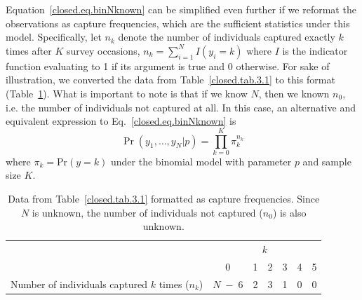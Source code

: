 Equation~\ref{closed.eq.binNknown} can be simplified even further if we reformat the
observations as capture frequencies, which are the sufficient
statistics under this model. Specifically, let $n_k$ denote the number
of individuals captured exactly $k$ times after $K$ survey occasions, $n_k = \sum_{i=1}^N
I(y_i = k)$ where $I$ is the indicator function evaluating to 1 if its
argument is true and 0 otherwise. For sake of illustration,
we converted the data from Table~\ref{closed.tab.3.1} to this
format (Table~\ref{closed.tab.3.1.nk}). What is important to note is
that if we know $N$, then we known $n_0$, i.e. the number of
individuals not captured at all. In this case, an alternative and equivalent expression to
Eq.~\ref{closed.eq.binNknown} is
\begin{equation}
  \Pr(y_1, \ldots, y_N | p) = \prod_{k=0}^K  \pi_{k}^{n_k}
  \label{closed.eq.multiNknown}
\end{equation}
where $\pi_{k} = \mathrm{Pr}(y=k)$ under the binomial model with
parameter $p$ and sample size $K$. 

\begin{table}[ht]
\centering
\caption{Data from Table~\ref{closed.tab.3.1} formatted as capture
  frequencies. Since $N$ is unknown, the number of individuals not
  captured ($n_0$) is also unknown.}
\begin{tabular}{lcccccc}
\hline
& \multicolumn{6}{c}{$k$} \\
\cline{2-7}
 & 0  & 1 & 2 & 3 & 4 & 5 \\
\hline
Number of individuals captured $k$ times ($n_k$) & $N\; - \; 6$ & 2 & 3 & 1 & 0 & 0 \\
\hline
\end{tabular}
\label{closed.tab.3.1.nk}
\end{table}

